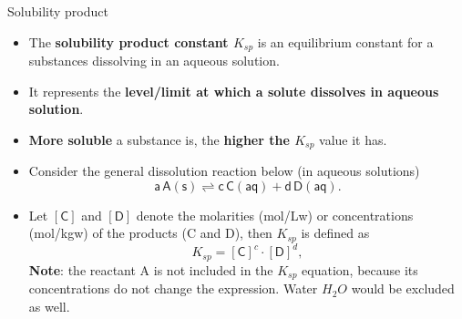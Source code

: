 %
%
\begin{frame}{Solubility product}
	\small
	\begin{itemize}
		\item The \alert{\bf solubility product constant $K_{sp}$} is an equilibrium constant for a substances dissolving in an aqueous solution. 
		\pause
		\item It represents the {\bf level/limit at which a solute dissolves in aqueous solution}.
		\pause
		\item {\bf More soluble} a substance is, the {\bf higher the $K_{sp}$} value it has.
		\pause
		\item Consider the general dissolution reaction below (in aqueous solutions)
		\[
		\mathsf{a\, A(s) \rightleftharpoons c\, C(aq) + d\, D (aq)}.
		\]
		\vskip -10pt
		\pause
		\item Let $\mathsf{[C]}$ and  $\mathsf{[D]}$ denote the molarities  (mol/Lw) or concentrations (mol/kgw)  of the products (C  and  D), then $K_{sp} $ is defined as
		\[
		K_{sp} = [\mathsf{C}]^c \cdot [\mathsf{D}]^d,
		\] 
		{\bf Note}: the reactant A is not included in the $K_{sp}$  equation, because its concentrations do not change the expression. Water $H_2O$ would be excluded as well.	
	\end{itemize}
\end{frame}
%
%
